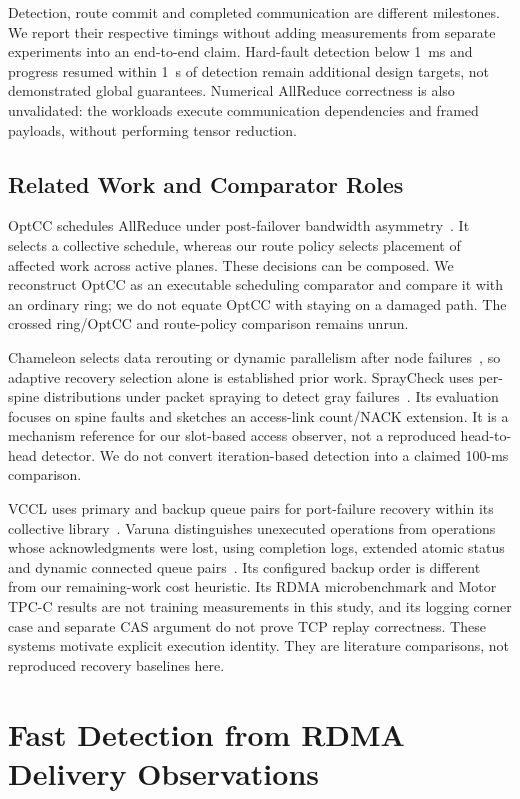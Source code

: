\documentclass[sigconf]{acmart}
\begin{document}
Detection, route commit and completed communication are different milestones.
We report their respective timings without adding measurements from separate
experiments into an end-to-end claim. Hard-fault detection below 1~ms and
progress resumed within 1~s of detection remain additional design targets,
not demonstrated global guarantees. Numerical AllReduce correctness is also
unvalidated: the workloads execute communication dependencies and framed
payloads, without performing tensor reduction.

\subsection{Related Work and Comparator Roles}
OptCC schedules AllReduce under post-failover bandwidth
asymmetry~\cite{optcc2026}. It selects a collective schedule, whereas our
route policy selects placement of affected work across active planes. These
decisions can be composed. We reconstruct OptCC as an executable scheduling
comparator and compare it with an ordinary ring; we do not equate OptCC
with staying on a damaged path. The crossed ring/OptCC and route-policy
comparison remains unrun.

Chameleon selects data rerouting or dynamic parallelism after node
failures~\cite{chameleon2026}, so adaptive recovery selection alone is
established prior work. SprayCheck uses per-spine distributions under packet
spraying to detect gray failures~\cite{spraycheck2026}. Its evaluation focuses
on spine faults and sketches an access-link count/NACK extension. It is a
mechanism reference for our slot-based access observer, not a reproduced
head-to-head detector. We do not convert iteration-based detection into
a claimed 100-ms comparison.

VCCL uses primary and backup queue pairs for port-failure recovery within
its collective library~\cite{vccl2026}. Varuna distinguishes unexecuted
operations from operations whose acknowledgments were lost, using completion
logs, extended atomic status and dynamic connected queue
pairs~\cite{varuna2026}. Its configured backup order is different from
our remaining-work cost heuristic. Its RDMA microbenchmark and Motor
TPC-C results are not training measurements in this study, and its logging
corner case and separate CAS argument do not prove TCP replay correctness.
These systems motivate explicit execution identity. They are literature
comparisons, not reproduced recovery baselines here.

\section{Fast Detection from RDMA Delivery Observations}
\label{sec:detection}
\end{document}
